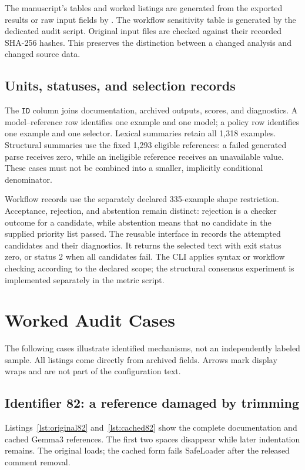 The manuscript's tables and worked listings are generated from the exported results or raw input fields by . The workflow sensitivity table is generated by the dedicated audit script. Original input files are checked against their recorded SHA-256 hashes. This preserves the distinction between a changed analysis and changed source data.

\subsection{Units, statuses, and selection records}
The \texttt{ID} column joins documentation, archived outputs, scores, and diagnostics. A model--reference row identifies one example and one model; a policy row identifies one example and one selector. Lexical summaries retain all 1,318 examples. Structural summaries use the fixed 1,293 eligible references: a failed generated parse receives zero, while an ineligible reference receives an unavailable value. These cases must not be combined into a smaller, implicitly conditional denominator.

Workflow records use the separately declared 335-example shape restriction. Acceptance, rejection, and abstention remain distinct: rejection is a checker outcome for a candidate, while abstention means that no candidate in the supplied priority list passed. The reusable interface in \mbox{} records the attempted candidates and their diagnostics. It returns the selected text with exit status zero, or status 2 when all candidates fail. The CLI applies syntax or workflow checking according to the declared scope; the structural consensus experiment is implemented separately in the metric script.

\clearpage
\section{Worked Audit Cases}
\label{app:cases}
The following cases illustrate identified mechanisms, not an independently labeled sample. All listings come directly from archived fields. Arrows mark display wraps and are not part of the configuration text.

\subsection{Identifier 82: a reference damaged by trimming}
Listings~\ref{lst:original82} and~\ref{lst:cached82} show the complete documentation and cached Gemma3 references. The first two spaces disappear while later indentation remains. The original loads; the cached form fails SafeLoader after the released comment removal.

